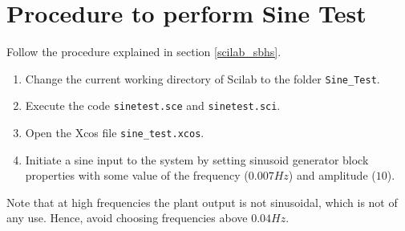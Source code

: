 \section{Procedure to perform Sine Test}
Follow the procedure explained in section \ref{scilab_sbhs}.
\begin{enumerate}
 \item Change the current working directory of Scilab to the folder {\tt Sine\_Test}. 
 \item Execute the code {\tt sinetest.sce} and {\tt sinetest.sci}.
 \item Open the Xcos file {\tt sine\_test.xcos}. 
 \item Initiate a sine input to the system by setting sinusoid generator block properties with some value of the frequency  
($0.007Hz$) and amplitude ($10$).
\end{enumerate}
Note that at high frequencies the plant output is not sinusoidal, which is not of any use. 
Hence, avoid choosing frequencies above $0.04Hz$.

